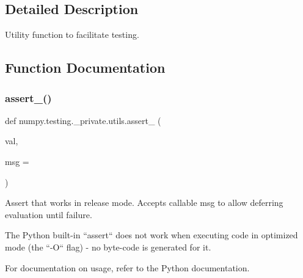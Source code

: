 \subsection{Detailed Description}
\begin{DoxyVerb}Utility function to facilitate testing.\end{DoxyVerb}
 

\subsection{Function Documentation}
\mbox{\label{namespacenumpy_1_1testing_1_1__private_1_1utils_aef78341a61b848b85378ec73fa2200d0}} 
\subsubsection{\texorpdfstring{assert\+\_\+()}{assert\_()}}
{\footnotesize\ttfamily def numpy.\+testing.\+\_\+private.\+utils.\+assert\+\_\+ (\begin{DoxyParamCaption}\item[{}]{val,  }\item[{}]{msg = {\ttfamily \textquotesingle{}\textquotesingle{}} }\end{DoxyParamCaption})}

\begin{DoxyVerb}Assert that works in release mode.
Accepts callable msg to allow deferring evaluation until failure.

The Python built-in ``assert`` does not work when executing code in
optimized mode (the ``-O`` flag) - no byte-code is generated for it.

For documentation on usage, refer to the Python documentation.\end{DoxyVerb}
 \mbox{\label{namespacenumpy_1_1testing_1_1__private_1_1utils_af089bfc5ce33a59f9f9b1335b339f20b}} 
